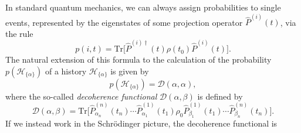 \documentclass[twocolumn,rmp,aps,amsmath,amsfonts,noshowkeys,noshowpacs]{revtex4}
\begin{document}
In standard quantum mechanics, we can always assign probabilities to
single events, represented by the eigenstates of some projection
operator $\widehat{P}^{(i)}(t)$, via the rule
%
\begin{equation}
p(i,t)=\text{Tr} \bigl[ \widehat{P}^{(i)\dagger}(t) \rho(t_0)
\widehat{P}^{(i)}(t) \bigr].
\end{equation}
%
The natural extension of this formula to the calculation of the
probability $p(\mathcal{H}_{\{\alpha\}})$ of a history
$\mathcal{H}_{\{\alpha\}}$ is given by
%
\begin{equation}  \label{eq:cprob}
p(\mathcal{H}_{\{\alpha\}}) = \mathcal{D}(\alpha,\alpha), 
\end{equation}
%
where the so-called {\em decoherence functional}
$\mathcal{D}(\alpha,\beta)$ is defined by \citep{GellMann:1990:uz} 
%
\begin{equation} \label{eq:df}
\mathcal{D}(\alpha,\beta) = \text{Tr} \big[ \widehat{P}^{(n)}_{\alpha_n}(t_n) 
 \cdots \widehat{P}^{(1)}_{\alpha_{1}}(t_{1}) \rho_0 
\widehat{P}^{(1)}_{\beta_{1}}(t_{1}) \cdots
\widehat{P}^{(n)}_{\beta_{n}}(t_n) \big].
\end{equation}
%
If we instead work in the Schr\"odinger picture, the decoherence
functional is
\end{document}
